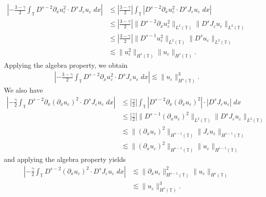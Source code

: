 \documentclass[12pt,reqno]{amsart}
\newcommand{\p}{\partial}
\newcommand{\ci}{\mathbb{T}}
\newcommand{\ee}{\varepsilon}
\theoremstyle{plain}  %
\theoremstyle{definition}
\begin{document}
\begin{appendices}
\begin{equation}
		\begin{split}
			\left | - \frac{3 -\gamma}{2} \int_\ci D^{s-2} \p_x u_\ee^2 \cdot
			D^s J_\ee u_\ee \; dx \right |
			& \le \left | \frac{3- \gamma}{2} \right | \int_\ci \left |
			D^{s-2} \p_x u_\ee^2 \cdot D^s J_\ee u_\ee \; dx \right | 
			\\
			& \le \left | \frac{3- \gamma}{2} \right |
			\|D^{s-2} \p_x u_\ee^2 \|_{L^2(\ci)} 
			\|D^s J_\ee u_\ee \|_{L^2(\ci)}
			\\
			& \le \left | \frac{3- \gamma}{2} \right |
			\|D^{s-1} u_\ee^2 \|_{L^2(\ci)} 
			\|D^s u_\ee \|_{L^2(\ci)}
			\\
			& \lesssim \| u_\ee^2 \|_{H^s(\ci)} \| u_\ee \|_{H^s(\ci)}.
		\end{split}
	\end{equation}
	Applying the algebra property, we obtain
	\begin{equation}
		\label{hl1}
		\begin{split}
			\left | - \frac{3 -\gamma}{2} \int_\ci D^{s-2} \p_x u_\ee^2 \cdot
			D^s J_\ee u_\ee \; dx \right |
			\lesssim \| u_\ee \|_{H^s(\ci)}^3.
		\end{split}
	\end{equation}
	We also have
	\begin{equation}
		\begin{split}
			\left |- \frac{\gamma}{2} \int_\ci D^{s-2} \p_x (\p_x u_\ee)^2 \cdot
			D^s J_\ee u_\ee \; dx \right |
			& \le \left | \frac{\gamma}{2} \right | \int_\ci \left | D^{s-2} \p_x (\p_x u_\ee)^2 \right |
			\cdot \left |D^s J_\ee u_\ee \right | \; dx
			\\
			& \le \left | \frac{\gamma}{2} \right |
			\| D^{s-1} (\p_x u_\ee)^2 \|_{L^2(\ci)}
			\| D^s J_\ee u_\ee \|_{L^2(\ci)}
			\\
			& \lesssim \|(\p_x u_\ee)^2 \|_{H^{s-1}(\ci)}
			\| J_\ee u_\ee \|_{H^{s-1}(\ci)} 
			\\
			& \lesssim \|(\p_x u_\ee)^2 \|_{H^{s-1}(\ci)} \| u_\ee \|_{H^{s-1}(\ci)} 
		\end{split}
	\end{equation}
	and applying the algebra property yields
	\begin{equation}
		\label{hl2}
		\begin{split}
		\left | - \frac{\gamma}{2} \int_\ci D^{s-2} (\p_x u_\ee)^2 \cdot
		D^s J_\ee u_\ee \; dx \right |
		& \lesssim \| \p_x u_\ee \|_{H^{s-1}(\ci)}^2 \| u_\ee \|_{H^s(\ci)} 
		\\
		& \lesssim \|u_\ee\|_{H^s(\ci)}^3.
	\end{split}

\end{equation}
\end{appendices}
\end{document}
